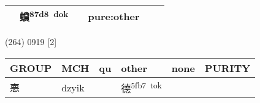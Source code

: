 \documentclass[14pt,a4paper]{scrartcl}
\begin{document}
\begin{longtable}[c]{@{}llllll@{}}
\begin{minipage}[t]{0.14\columnwidth}\raggedright\strut
\strut\end{minipage} &
\begin{minipage}[t]{0.14\columnwidth}\raggedright\strut
蟘\textsuperscript{87d8~dok}
\strut\end{minipage} &
\begin{minipage}[t]{0.14\columnwidth}\raggedright\strut
\strut\end{minipage} &
\begin{minipage}[t]{0.14\columnwidth}\raggedright\strut
pure:other
\strut\end{minipage}\tabularnewline
\bottomrule
\end{longtable}

(264) 0919 {[}2{]}

\begin{longtable}[c]{@{}llllll@{}}
\toprule
\begin{minipage}[b]{0.14\columnwidth}\raggedright\strut
GROUP
\strut\end{minipage} &
\begin{minipage}[b]{0.14\columnwidth}\raggedright\strut
MCH
\strut\end{minipage} &
\begin{minipage}[b]{0.14\columnwidth}\raggedright\strut
qu
\strut\end{minipage} &
\begin{minipage}[b]{0.14\columnwidth}\raggedright\strut
other
\strut\end{minipage} &
\begin{minipage}[b]{0.14\columnwidth}\raggedright\strut
none
\strut\end{minipage} &
\begin{minipage}[b]{0.14\columnwidth}\raggedright\strut
PURITY
\strut\end{minipage}\tabularnewline
\midrule
\endhead
\begin{minipage}[t]{0.14\columnwidth}\raggedright\strut
𢛳
\strut\end{minipage} &
\begin{minipage}[t]{0.14\columnwidth}\raggedright\strut
dzyik
\strut\end{minipage} &
\begin{minipage}[t]{0.14\columnwidth}\raggedright\strut
\strut\end{minipage} &
\begin{minipage}[t]{0.14\columnwidth}\raggedright\strut
德\textsuperscript{5fb7~tok}
\strut\end{minipage} &

\end{longtable}
\end{document}
